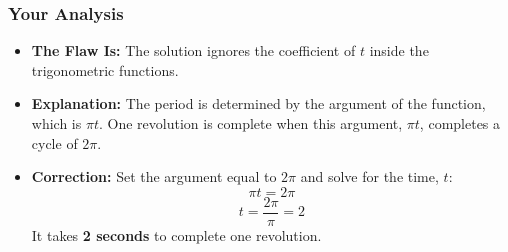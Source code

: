 \documentclass{article}
\begin{document}
\subsubsection*{Your Analysis}
\begin{itemize}
    \item \textbf{The Flaw Is:} The solution ignores the coefficient of $t$ inside the trigonometric functions.
    \item \textbf{Explanation:} The period is determined by the argument of the function, which is $\pi t$. One revolution is complete when this argument, $\pi t$, completes a cycle of $2\pi$.
    \item \textbf{Correction:}
    Set the argument equal to $2\pi$ and solve for the time, $t$:
    \[ \pi t = 2\pi \]
    \[ t = \frac{2\pi}{\pi} = 2 \]
    It takes \textbf{2 seconds} to complete one revolution.

\end{itemize}
\end{document}
